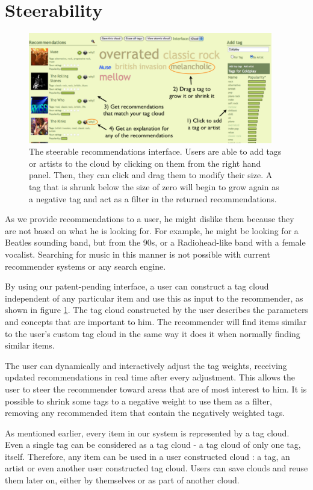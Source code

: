 \documentclass[letterpaper,10pt,twocolumn]{article}
\begin{document}
\section{Steerability}
\begin{figure}
\begin{center}
\includegraphics[width=0.95\textwidth]{steerable-withtxt}
\end{center}
\caption{The steerable recommendations interface. Users are able to add tags or artists to the cloud by clicking on them from the right hand panel. Then, they can click and drag them to modify their size. A tag that is shrunk below the size of zero will begin to grow again as a negative tag and act as a filter in the returned recommendations.}
\label{fig:steerable}
\end{figure}

As we provide recommendations to a user, he might dislike them
because they are not based on what he is looking for. For example,
he might be looking for a Beatles sounding band, but from the 90s,
or a Radiohead-like band with a female vocalist. Searching for music
in this manner is not possible with current recommender systems or
any search engine.

By using our patent-pending interface, a user can construct a tag
cloud independent of any particular item and use this as input to
the recommender, as shown in figure \ref{fig:steerable}.  The tag
cloud constructed by the user describes the parameters and concepts
that are important to him. The recommender will find items similar
to the user's custom tag cloud in the same way it does it when
normally finding similar items.

The user can dynamically and interactively adjust the tag weights,
receiving updated recommendations in real time after every adjustment.
This allows the user to steer the recommender toward areas that are
of most interest to him. It is possible to shrink some tags to a
negative weight to use them as a filter, removing any recommended
item that contain the negatively weighted tags.

As mentioned earlier, every item in our system is represented by a
tag cloud. Even a single tag can be considered as a tag cloud - a
tag cloud of only one tag, itself.  Therefore, any item can be used
in a user constructed cloud : a tag, an artist or even another user
constructed tag cloud. Users can save clouds and reuse them later
on, either by themselves or as part of another cloud.
\end{document}
